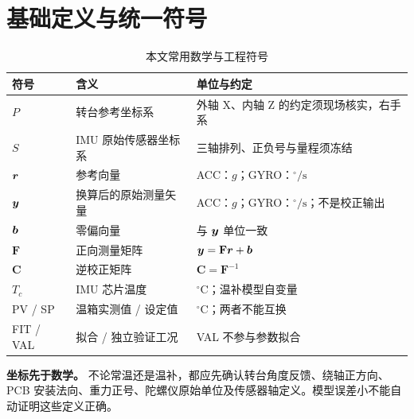 \section{基础定义与统一符号}
\begin{table}[htbp]
\centering\small
\caption{本文常用数学与工程符号}\label{tab:notation}
\begin{tabularx}{\linewidth}{@{}p{24mm}p{40mm}Y@{}}\toprule
符号 & 含义 & 单位与约定\\\midrule
$P$ & 转台参考坐标系 & 外轴 X、内轴 Z 的约定须现场核实，右手系\\
$S$ & IMU 原始传感器坐标系 & 三轴排列、正负号与量程须冻结\\
$\bm{r}$ & 参考向量 & ACC：$g$；GYRO：$^\circ/\mathrm{s}$\\
$\bm{y}$ & 换算后的原始测量矢量 & ACC：$g$；GYRO：$^\circ/\mathrm{s}$；不是校正输出\\
$\bm{b}$ & 零偏向量 & 与 $\bm{y}$ 单位一致\\
$\mathbf F$ & 正向测量矩阵 & $\bm{y}=\mathbf F\bm{r}+\bm{b}$\\
$\mathbf C$ & 逆校正矩阵 & $\mathbf C=\mathbf F^{-1}$\\
$T_c$ & IMU 芯片温度 & $^\circ\mathrm C$；温补模型自变量\\
PV / SP & 温箱实测值 / 设定值 & $^\circ\mathrm C$；两者不能互换\\
FIT / VAL & 拟合 / 独立验证工况 & VAL 不参与参数拟合\\\bottomrule
\end{tabularx}
\end{table}
\begin{notice}
\textbf{坐标先于数学。} 不论常温还是温补，都应先确认转台角度反馈、绕轴正方向、PCB 安装法向、重力正号、陀螺仪原始单位及传感器轴定义。模型误差小不能自动证明这些定义正确。
\end{notice}



